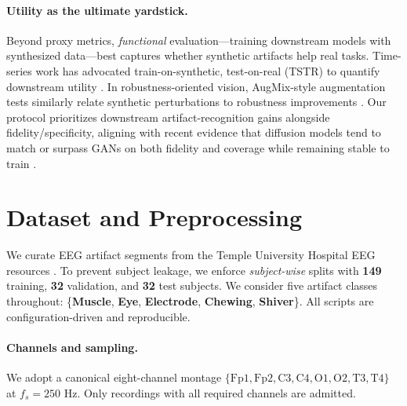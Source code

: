 \documentclass{article}
\begin{document}
\paragraph{Utility as the ultimate yardstick.}
Beyond proxy metrics, \emph{functional} evaluation—training downstream models with synthesized data—best captures whether synthetic artifacts help real tasks. Time-series work has advocated train-on-synthetic, test-on-real (TSTR) to quantify downstream utility \citep{yoon2019timegan}. In robustness-oriented vision, AugMix-style augmentation tests similarly relate synthetic perturbations to robustness improvements \citep{hendrycks2020augmix}. Our protocol prioritizes downstream artifact-recognition gains alongside fidelity/specificity, aligning with recent evidence that diffusion models tend to match or surpass GANs on both fidelity and coverage while remaining stable to train \citep{dhariwal2021dmbeatgans,nichol2021improved}.



\section{Dataset and Preprocessing}
\label{sec:data}
We curate EEG artifact segments from the Temple University Hospital EEG resources \citep{obeid2016temple}. To prevent subject leakage, we enforce \emph{subject-wise} splits with \textbf{149} training, \textbf{32} validation, and \textbf{32} test subjects. We consider five artifact classes throughout: \{\textbf{Muscle}, \textbf{Eye}, \textbf{Electrode}, \textbf{Chewing}, \textbf{Shiver}\}. All scripts are configuration-driven and reproducible.

\paragraph{Channels and sampling.}
We adopt a canonical eight-channel montage \(\{\text{Fp1}, \text{Fp2}, \text{C3}, \text{C4}, \text{O1}, \text{O2}, \text{T3}, \text{T4}\}\) at \(f_s = 250\) Hz. Only recordings with all required channels are admitted.
\end{document}
